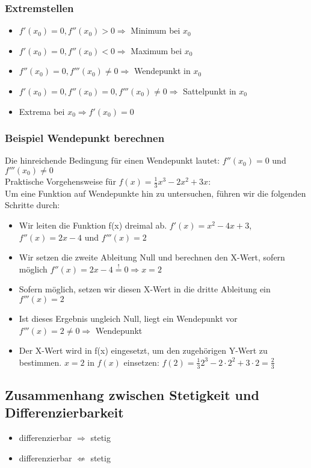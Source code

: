 \subsubsection{Extremstellen}
\begin{itemize}
	\item $f'(x_0) = 0, f''(x_0) > 0 \Rightarrow$ Minimum bei $x_0$
	\item $f'(x_0) = 0, f''(x_0) < 0 \Rightarrow$ Maximum bei $x_0$
	\item $f''(x_0) = 0, f'''(x_0) \neq 0 \Rightarrow$ Wendepunkt in $x_0$
	\item $f'(x_0) = 0, f''(x_0) = 0, f'''(x_0) \neq 0 \Rightarrow$ Sattelpunkt in
  	$x_0$
	\item Extrema bei $x_0 \Rightarrow f'(x_0) = 0$
\end{itemize}

\subsubsection{Beispiel Wendepunkt berechnen}
Die hinreichende Bedingung für einen Wendepunkt lautet: $f''(x_0) = 0$ und $f'''(x_0) \not= 0$\\
 
Praktische Vorgehensweise für $f(x) = \frac{1}{3}x^3-2x^2+3x$:\\
Um eine Funktion auf Wendepunkte hin zu untersuchen, führen wir die folgenden Schritte durch:
\begin{itemize}
	\item Wir leiten die Funktion f(x) dreimal ab. $f'(x) = x^2-4x+3$, $f''(x) = 2x-4$ und $f'''(x) = 2$
	\item Wir setzen die zweite Ableitung Null und berechnen den X-Wert, sofern möglich  
		$f''(x) = 2x-4 \stackrel{!}{=} 0 \Rightarrow x = 2$ 
	\item Sofern möglich, setzen wir diesen X-Wert in die dritte Ableitung ein
		$f'''(x) = 2$
	\item Ist dieses Ergebnis ungleich Null, liegt ein Wendepunkt vor
		$f'''(x) = 2 \not= 0 \Rightarrow$ Wendepunkt
	\item Der X-Wert wird in f(x) eingesetzt, um den zugehörigen Y-Wert zu bestimmen.
		$x = 2$ in $f(x)$ einsetzen: $f(2) = \frac{1}{3}2^3-2\cdot2^2+3\cdot2 = \frac{2}{3}$
\end{itemize}

\subsection{Zusammenhang zwischen Stetigkeit und Differenzierbarkeit}
\begin{itemize}
	\item differenzierbar $\Rightarrow$ stetig
	\item differenzierbar $\not\Leftarrow$ stetig
\end{itemize}

